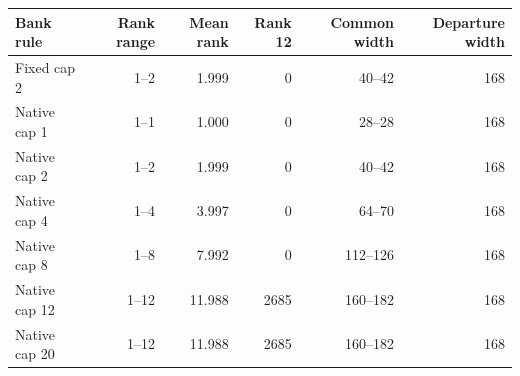 \begin{tabular}{@{}lrrrrr@{}}
\toprule
Bank rule & Rank range & Mean rank & Rank 12 & Common width & Departure width \\
\midrule
Fixed cap 2 & 1--2 & 1.999 & 0 & 40--42 & 168 \\
Native cap 1 & 1--1 & 1.000 & 0 & 28--28 & 168 \\
Native cap 2 & 1--2 & 1.999 & 0 & 40--42 & 168 \\
Native cap 4 & 1--4 & 3.997 & 0 & 64--70 & 168 \\
Native cap 8 & 1--8 & 7.992 & 0 & 112--126 & 168 \\
Native cap 12 & 1--12 & 11.988 & 2685 & 160--182 & 168 \\
Native cap 20 & 1--12 & 11.988 & 2685 & 160--182 & 168 \\
\bottomrule
\end{tabular}

